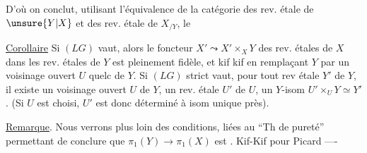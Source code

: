 D'où on conclut, utilisant l'équivalence de la catégorie des rev. étale de $\unsure{Y|X}$ et des rev. étale de $X_{/Y}$, le

\uline{Corollaire} Si $(LG)$ vaut, alors le foncteur $X'\leadsto X'\times_X Y$ des rev. étales de $X$ dans les rev. étales de $Y$ est pleinement fidèle,  et kif kif en remplaçant $Y$ par un voisinage ouvert $U$ quelc de $Y$. Si $(LG)$ strict vaut,  pour tout rev étale $Y'$ de $Y$, il existe un  voisinage ouvert $U$ de $Y$,  un rev. étale $U'$ de $U$,   un $Y$-isom $U'\times_U Y\simeq Y'$. (Si $U$ est choisi, $U'$ est donc déterminé à isom unique près).

\uline{Remarque}. Nous verrons plus loin des conditions, liées au ``Th de pureté'' permettant de conclure que $\pi_1(Y)\longrightarrow\pi_1(X)$ est . Kif-Kif pour Picard ----

